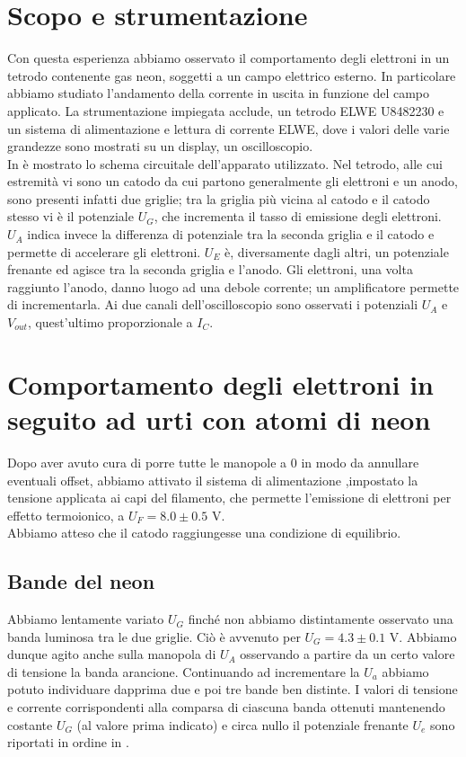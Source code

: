 \section{Scopo e strumentazione}

Con questa esperienza abbiamo osservato il comportamento degli elettroni in un tetrodo contenente gas neon, soggetti a un campo elettrico esterno. In particolare abbiamo studiato l'andamento della corrente in uscita in funzione del campo applicato. La strumentazione impiegata acclude, un tetrodo ELWE U8482230 e un sistema di alimentazione e lettura di corrente ELWE, dove i valori delle varie grandezze sono mostrati su un display, un oscilloscopio.\\
In  è mostrato lo schema circuitale dell'apparato utilizzato. Nel tetrodo, alle cui estremità vi sono un catodo da cui partono generalmente gli elettroni e un anodo, sono presenti infatti due griglie; tra la griglia più vicina al catodo e il catodo stesso vi è il potenziale 
$U_G$, che incrementa il tasso di emissione degli elettroni. $U_A$ indica invece la differenza di potenziale tra la seconda griglia e il catodo e permette di accelerare gli elettroni. $U_E$ è, diversamente dagli altri, un potenziale frenante ed agisce tra la seconda griglia e l'anodo. Gli elettroni, una volta raggiunto l'anodo, danno luogo ad una debole corrente; un amplificatore permette di incrementarla. Ai due canali dell'oscilloscopio sono osservati i potenziali $U_A$ e $V_{out}$, quest'ultimo proporzionale a $I_C$.

\section{Comportamento degli elettroni in seguito ad urti con atomi di neon}

Dopo aver avuto cura di porre tutte le manopole a 0 in modo da annullare eventuali offset, abbiamo attivato il sistema di alimentazione ,impostato la tensione applicata ai capi del filamento, che permette l'emissione di elettroni per effetto termoionico, a $U_F = 8.0 \pm 0.5$ V.\\  Abbiamo atteso che il catodo raggiungesse una condizione di equilibrio.

\subsection{Bande del neon}

Abbiamo lentamente variato $U_G$ finché non abbiamo distintamente osservato una banda luminosa tra le due griglie. Ciò è avvenuto per $U_G = 4.3 \pm 0.1$ V. Abbiamo dunque agito anche sulla manopola di $U_A$ osservando a partire da un certo valore di tensione la banda arancione. Continuando ad incrementare la $U_a$ abbiamo potuto individuare dapprima due e poi tre bande ben distinte.  I valori di tensione e corrente corrispondenti alla comparsa di ciascuna banda ottenuti mantenendo costante $U_G$ (al valore prima indicato) e circa nullo il potenziale frenante $U_e$ sono riportati in ordine in .\\

